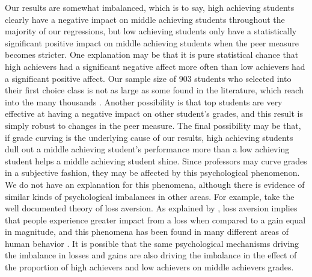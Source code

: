 Our results are somewhat imbalanced, which is to say, high achieving students clearly have a negative impact on middle achieving students throughout the majority of our regressions, but low achieving students only have a statistically significant positive impact on middle achieving students when the peer measure becomes stricter. 
One explanation may be that it is pure statistical chance that high achievers had a significant negative affect more often than low achievers had a significant positive affect. 
Our sample size of 903 students who selected into their first choice class is not as large as some found in the literature, which reach into the many thousands \citep{kang2007classroom,lavy2012good}. 
Another possibility is that top students are very effective at having a negative impact on other student's grades, and this result is simply robust to changes in the peer measure. 
The final possibility may be that, if grade curving is the underlying cause of our results, high achieving students dull out a middle achieving student's performance more than a low achieving student helps a middle achieving student shine.
Since professors may curve grades in a subjective fashion, they may be affected by this psychological phenomenon. 
We do not have an explanation for this phenomena, although there is evidence of similar kinds of psychological imbalances in other areas. 
For example, take the well documented theory of loss aversion. 
As explained by \citet{tversky1991loss}, loss aversion implies that people experience greater impact from a loss when compared to a gain equal in magnitude, and this phenomena has been found in many different areas of human behavior \citep{shalev2002loss,goette2004loss}. 
It is possible that the same psychological mechanisms driving the imbalance in losses and gains are also driving the imbalance in the effect of the proportion of high achievers and low achievers on middle achievers grades. 

